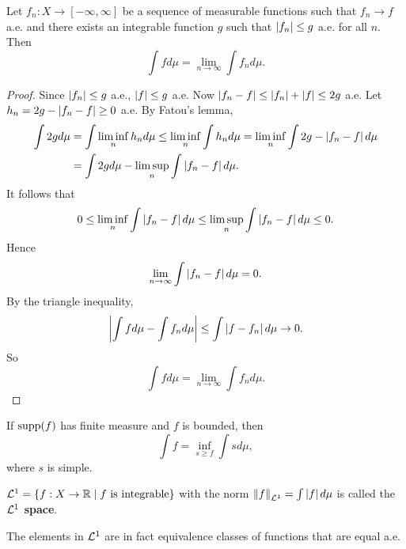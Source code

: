 \begin{theorem}
    Let $f_n:X\to[-\infty,\infty]$ be a sequence of measurable 
    functions such that $f_n\to f$ a.e. and there exists an integrable 
    function $g$ such that $\left\lvert {f_n} \right\rvert\leq g$ a.e. for all $n$. 
    Then
    \begin{equation*}
        \int fd\mu = \lim_{n\to\infty}\int f_nd\mu.
    \end{equation*} 
\end{theorem}
\begin{proof}
    Since $\left\lvert {f_n} \right\rvert\leq g$ a.e., $\left\lvert {f} \right\rvert\leq g$ a.e. Now 
    $\left\lvert {f_n-f} \right\rvert\leq \left\lvert {f_n} \right\rvert+\left\lvert {f} \right\rvert\leq 2g$ a.e. Let $h_n 
    = 2g - \left\lvert {f_n-f} \right\rvert\geq 0$ a.e. By Fatou's lemma,
    \begin{equation*}
        \begin{split}
            \int 2gd\mu &= \int \liminf_n h_nd\mu \leq \liminf_n \int h_nd\mu 
            = \liminf_n \int 2g-\left\lvert {f_n-f} \right\rvert d\mu \\
            &= \int 2gd\mu - \limsup_n \int \left\lvert {f_n-f} \right\rvert d\mu.
        \end{split}
    \end{equation*}
    It follows that 
    \begin{equation*}
        0 \leq \liminf_n \int \left\lvert {f_n-f} \right\rvert d\mu \leq \limsup_n \int \left\lvert {f_n-f} \right\rvert d\mu \leq 0.
    \end{equation*}
    Hence 
    \begin{equation*}
        \lim_{n\to\infty}\int \left\lvert {f_n-f} \right\rvert d\mu = 0.
    \end{equation*}
    By the triangle inequality,
    \begin{equation*}
        \left\lvert {\int fd\mu - \int f_nd\mu} \right\rvert \leq \int \left\lvert {f-f_n} \right\rvert d\mu \to 0.
    \end{equation*}
    So 
    \begin{equation*}
        \int fd\mu = \lim_{n\to\infty}\int f_nd\mu.
    \end{equation*}
\end{proof}
\begin{remark}
    If $\supp{f}$ has finite measure and $f$ is bounded, then 
    \begin{equation*}
        \int f = \inf_{s\geq f} \int sd\mu, 
    \end{equation*}
    where $s$ is simple.
\end{remark}

\begin{definition}
    $\mathcal{L}^1 = \left\{ f:X\to\mathbb{R} \;\middle\vert\; f\text{ is integrable} \right\}$ with the 
    norm $\left\lVert {f} \right\rVert_{\mathcal{L}^1} = \int \left\lvert {f} \right\rvert d\mu$ is called 
    the \textbf{$\mathcal{L}^1$ space}.
\end{definition}
\begin{remark}
    The elements in $\mathcal{L}^1$ are in fact equivalence classes 
    of functions that are equal a.e.
\end{remark}

